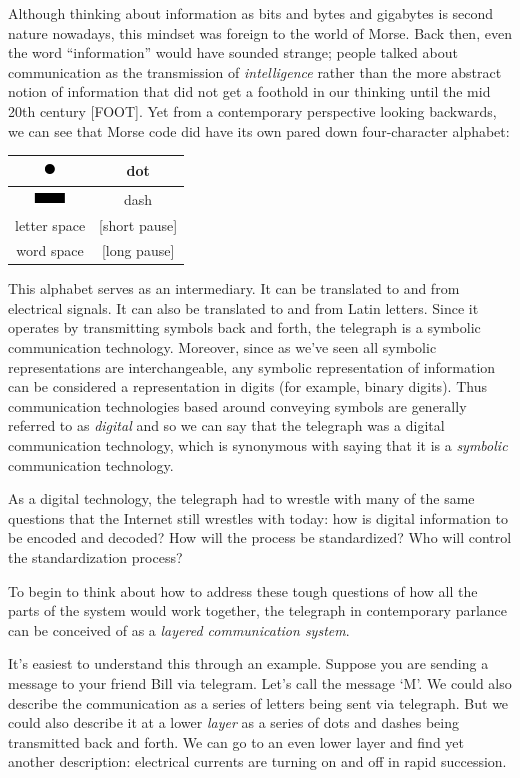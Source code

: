 \documentclass[UTF8]{book}
\newcommand*\thickdash{\includegraphics{thick-dash2}}
\newcommand*\thickdot{\includegraphics{thick-dot2}}
\begin{document}
\begin{CJK}{UTF8}{gbsn}
Although thinking about information as bits and bytes and gigabytes is second nature nowadays, this mindset was foreign to the world of Morse. Back then, even the word ``information'' would have sounded strange; people talked about communication as the transmission of \emph{intelligence} rather than the more abstract notion of information that did not get a foothold in our thinking until the mid 20th century [FOOT]. Yet from a contemporary perspective looking backwards, we can see that Morse code did have its own pared down four-character alphabet:

\begin{center}
\begin{tabular}{cc}
\thickdot & dot \\
\hline
\thickdash & dash \\
\hline
letter space & [short pause]  \\
\hline
word space & [long pause]  \\
\end{tabular}
\end{center}

This alphabet serves as an intermediary. It can be translated to and from electrical signals. It can also be translated to and from Latin letters. Since it operates by transmitting symbols back and forth, the telegraph is a symbolic communication technology. Moreover, since as we've seen all symbolic representations are interchangeable, any symbolic representation of information can be considered a representation in digits (for example, binary digits). Thus communication technologies based around conveying symbols are generally referred to as \emph{digital} and so we can say that the telegraph was a digital communication technology, which is synonymous with saying that it is a \emph{symbolic} communication technology.

As a digital technology, the telegraph had to wrestle with many of the same questions that the Internet still wrestles with today: how is digital information to be encoded and decoded? How will the process be standardized? Who will control the standardization process?

To begin to think about how to address these tough questions of how all the parts of the system would work together, the telegraph in contemporary parlance can be conceived of as a \emph{layered communication system}.

It's easiest to understand this through an example. Suppose you are sending a message to your friend Bill via telegram. Let's call the message `M'. We could also describe the communication as a series of letters being sent via telegraph. But we could also describe it at a lower \emph{layer} as a series of dots and dashes being transmitted back and forth. We can go to an even lower layer and find yet another description: electrical currents are turning on and off in rapid succession.


\end{CJK}
\end{document}
